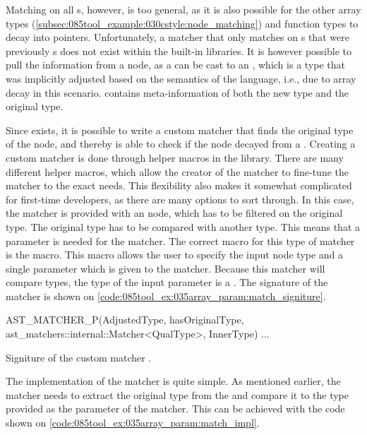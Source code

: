 Matching on all s, however, is too general, as it is also possible for the other array types (\cref{subsec:085tool_example:030cstyle:node_matching}) and function types to decay into pointers.
Unfortunately, a matcher that only matches on s that were previously s does not exist within the built-in libraries. It is however possible to pull the information from a node, as a  can be cast to an , which is a type that was implicitly adjusted based on the semantics of the language, i.e., due to array decay in this scenario.  contains meta-information of both the new type and the original type.

Since  exists, it is possible to write a custom matcher that finds the original type of the node, and thereby is able to check if the node decayed from a .
Creating a custom matcher is done through helper macros in the library. There are many different helper macros, which allow the creator of the matcher to fine-tune the matcher to the exact needs. This flexibility also makes it somewhat complicated for first-time developers, as there are many options to sort through. In this case, the matcher is provided with an  node, which has to be filtered on the original type. The original type has to be compared with another type. This means that a parameter is needed for the matcher. The correct macro for this type of matcher is the  macro. This macro allows the user to specify the input node type and a single parameter which is given to the matcher. Because this matcher will compare types, the type of the input parameter is a . The signature of the matcher is shown on \cref{code:085tool_ex:035array_param:match_signiture}.

\begin{listing}[H]
    \begin{cppcode}
AST_MATCHER_P(AdjustedType, hasOriginalType, ast_matchers::internal::Matcher<QualType>, InnerType) {
    ...
}
    \end{cppcode}
    \caption{Signiture of the custom matcher .}
    \label{code:085tool_ex:035array_param:match_signiture}
\end{listing}

The implementation of the matcher is quite simple. As mentioned earlier, the matcher needs to extract the original type from the  and compare it to the type provided as the parameter of the matcher. This can be achieved with the code shown on \cref{code:085tool_ex:035array_param:match_impl}.

